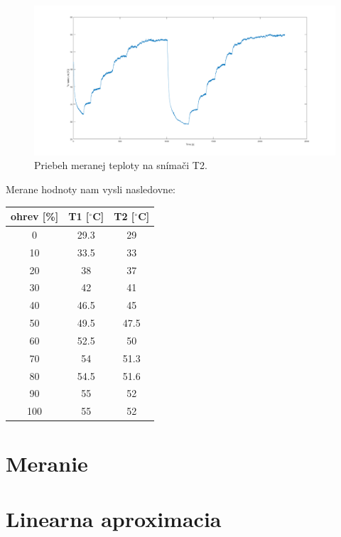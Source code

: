 \documentclass{article}
\begin{document}
\begin{figure}[!htbp]
	\begin{center}
		\includegraphics[width=\textwidth]{./include/teplota.png}
		\caption{Priebeh meranej teploty na snímači T2.}
		\label{fig:mt2}
	\end{center}
	\hfill
\end{figure}

Merane hodnoty nam vysli nasledovne:

\begin{center}
\begin{tabular}{ |c|c|c| }
 \hline
 ohrev [\%] & T1 [$^\circ $C] & T2 [$^\circ $C] \\
 \hline
   0 & 29.3 & 29 \\
  10 & 33.5 & 33 \\
  20 & 38 & 37 \\
  30 & 42 & 41\\
  40 & 46.5 & 45\\
  50 & 49.5 & 47.5\\
  60 & 52.5 & 50 \\
  70 & 54 & 51.3 \\
  80 & 54.5 & 51.6 \\
  90 & 55 & 52 \\
 100 & 55 & 52 \\
 \hline
\end{tabular}
\end{center}
\newpage

\section{Meranie}
\label{sec:meranie}

\clearpage

\section{Linearna aproximacia}
\label{sec:lin}
\end{document}
